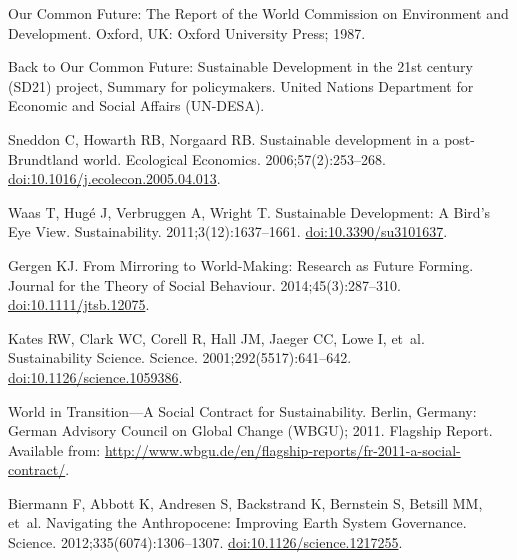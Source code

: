 \documentclass[10pt,a4paper]{article}
\renewcommand*{\refname}{References and Notes}
\begin{document}
\vspace{\baselineskip}

\begin{multicols}{2}
\renewcommand*{\refname}{\normalsize{References and Notes}}

\begin{footnotesize}
%
%

\begin{thebibliography}{10}

Our Common Future: The Report of the World Commission on Environment and
  Development.
\newblock Oxford, UK: Oxford University Press; 1987.

Back to Our Common Future: Sustainable Development in the 21st century (SD21)
  project, Summary for policymakers.
\newblock United Nations Department for Economic and Social Affairs (UN-DESA).

Sneddon C, Howarth RB, Norgaard RB.
\newblock Sustainable development in a post-Brundtland world.
\newblock Ecological Economics. 2006;57(2):253--268.
\newblock
  \href{https://doi.org/10.1016/j.ecolecon.2005.04.013}{doi:10.1016/j.ecolecon.2005.04.013}.

Waas T, Hug{\'{e}} J, Verbruggen A, Wright T.
\newblock Sustainable Development: A Bird's Eye View.
\newblock Sustainability. 2011;3(12):1637--1661.
\newblock \href{https://doi.org/10.3390/su3101637}{doi:10.3390/su3101637}.

Gergen KJ.
\newblock From Mirroring to World-Making: Research as Future Forming.
\newblock Journal for the Theory of Social Behaviour. 2014;45(3):287--310.
\newblock \href{https://doi.org/10.1111/jtsb.12075}{doi:10.1111/jtsb.12075}.

Kates RW, Clark WC, Corell R, Hall JM, Jaeger CC, Lowe I, et~al.
\newblock Sustainability Science.
\newblock Science. 2001;292(5517):641--642.
\newblock
  \href{https://doi.org/10.1126/science.1059386}{doi:10.1126/science.1059386}.

World in Transition---A Social Contract for Sustainability.
\newblock Berlin, Germany: German Advisory Council on Global Change (WBGU);
  2011. Flagship Report.
\newblock Available from:
  \url{http://www.wbgu.de/en/flagship-reports/fr-2011-a-social-contract/}.

Biermann F, Abbott K, Andresen S, Backstrand K, Bernstein S, Betsill MM, et~al.
\newblock Navigating the Anthropocene: Improving Earth System Governance.
\newblock Science. 2012;335(6074):1306--1307.
\newblock
  \href{https://doi.org/10.1126/science.1217255}{doi:10.1126/science.1217255}.


\end{thebibliography}
\end{footnotesize}
\end{multicols}
\end{document}
